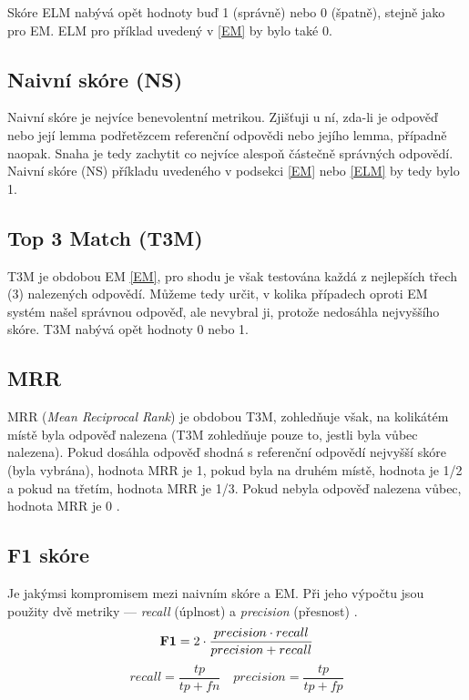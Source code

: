 Skóre ELM nabývá opět hodnoty buď 1 (správně) nebo 0 (špatně), stejně jako pro EM. ELM pro příklad uvedený v \ref{EM} by bylo také 0.

\subsection{Naivní skóre (NS)}
Naivní skóre je nejvíce benevolentní metrikou. Zjišťuji u ní, zda-li je odpověď nebo její lemma podřetězcem referenční odpovědi nebo jejího lemma, případně naopak. Snaha je tedy zachytit co nejvíce alespoň částečně správných odpovědí. Naivní skóre (NS) příkladu uvedeného v podsekci \ref{EM} nebo \ref{ELM} by tedy bylo 1. 

\subsection{Top 3 Match (T3M)}
T3M je obdobou EM \ref{EM}, pro shodu je však testována každá z nejlepších třech (3) nalezených odpovědí. Můžeme tedy určit, v kolika případech oproti EM systém našel správnou odpověď, ale nevybral ji, protože nedosáhla nejvyššího skóre. T3M nabývá opět hodnoty 0 nebo 1.

\subsection{MRR}
MRR (\emph{Mean Reciprocal Rank}) je obdobou T3M, zohledňuje však, na kolikátém místě byla odpověď nalezena (T3M zohledňuje pouze to, jestli byla vůbec nalezena). Pokud dosáhla odpověď shodná s referenční odpovědí nejvyšší skóre (byla vybrána), hodnota MRR je 1, pokud byla na druhém místě, hodnota je 1/2 a pokud na třetím, hodnota MRR je 1/3. Pokud nebyla odpověď nalezena vůbec, hodnota MRR je 0 \cite{MRR}.

\subsection{F1 skóre}
Je jakýmsi kompromisem mezi naivním skóre a EM. Při jeho výpočtu jsou použity dvě metriky --- \emph{recall} (úplnost) a \emph{precision} (přesnost) \cite{information_retrieval}.
\begin{equation}
    \text{\textbf{F1}} = 2\cdot \frac{precision \cdot recall}{precision + recall} 
\end{equation}
\begin{equation}
recall = \frac{tp}{tp+fn} \quad precision = \frac{tp}{tp+fp}
\end{equation}

